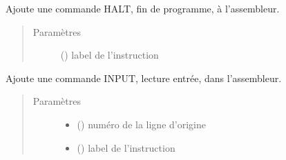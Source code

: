 \documentclass[letterpaper,10pt,french]{sphinxmanual}
\begin{document}
\begin{fulllineitems}
\begin{fulllineitems}
\label{\detokenize{assembleurcontainer:assembleurcontainer.AssembleurContainer.pushHalt}}
Ajoute une commande HALT, fin de programme, à l’assembleur.
\begin{quote}\begin{description}
\item[{Paramètres}] \leavevmode
{} (\sphinxstyleliteralemphasis{\sphinxupquote{{[}}}{\hyperref[\detokenize{label:label.Label}]{\sphinxcrossref{\sphinxstyleliteralemphasis{\sphinxupquote{Label}}}}}\sphinxstyleliteralemphasis{\sphinxupquote{{]}}}) \textendash{} label de l’instruction

\end{description}\end{quote}

\end{fulllineitems}


\begin{fulllineitems}
\label{\detokenize{assembleurcontainer:assembleurcontainer.AssembleurContainer.pushInput}}
Ajoute une commande INPUT, lecture entrée, dans l’assembleur.
\begin{quote}\begin{description}
\item[{Paramètres}] \leavevmode\begin{itemize}
\item {} 
 () \textendash{} numéro de la ligne d’origine

\item {} 
 (\sphinxstyleliteralemphasis{\sphinxupquote{{[}}}{\hyperref[\detokenize{label:label.Label}]{\sphinxcrossref{\sphinxstyleliteralemphasis{\sphinxupquote{Label}}}}}\sphinxstyleliteralemphasis{\sphinxupquote{{]}}}) \textendash{} label de l’instruction


\end{itemize}
\end{description}
\end{quote}
\end{fulllineitems}
\end{fulllineitems}
\end{document}
